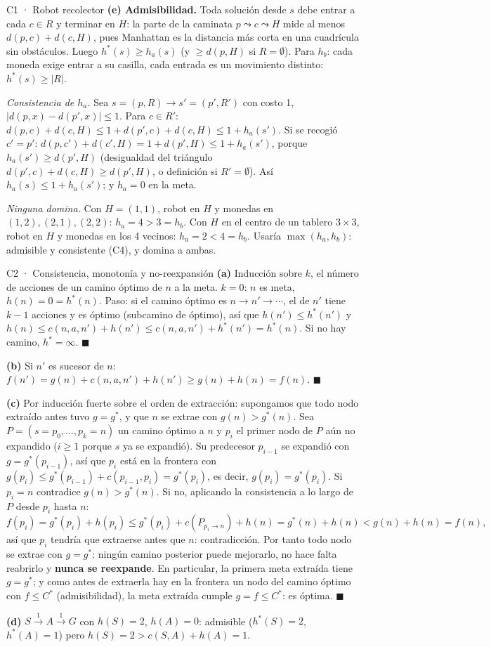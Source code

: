 \begin{solucion}{C1 · Robot recolector}
\textbf{(e) Admisibilidad.} Toda solución desde $s$ debe entrar a cada $c\in R$ y terminar en $H$: la
parte de la caminata $p\leadsto c\leadsto H$ mide al menos $d(p,c)+d(c,H)$, pues Manhattan es la
distancia más corta en una cuadrícula sin obstáculos. Luego $h^*(s)\ge h_a(s)$ (y $\ge d(p,H)$ si
$R=\emptyset$). Para $h_b$: cada moneda exige entrar a su casilla, cada entrada es un movimiento distinto:
$h^*(s)\ge|R|$.

\emph{Consistencia de $h_a$.} Sea $s=(p,R)\to s'=(p',R')$ con costo 1, $|d(p,x)-d(p',x)|\le1$.
Para $c\in R'$: $d(p,c)+d(c,H)\le1+d(p',c)+d(c,H)\le1+h_a(s')$. Si se recogió $c'=p'$:
$d(p,c')+d(c',H)=1+d(p',H)\le1+h_a(s')$, porque $h_a(s')\ge d(p',H)$ (desigualdad del triángulo
$d(p',c)+d(c,H)\ge d(p',H)$, o definición si $R'=\emptyset$). Así $h_a(s)\le1+h_a(s')$; y $h_a=0$ en la meta.

\emph{Ninguna domina.} Con $H=(1,1)$, robot en $H$ y monedas en $(1,2),(2,1),(2,2)$: $h_a=4>3=h_b$.
Con $H$ en el centro de un tablero $3\times3$, robot en $H$ y monedas en los 4 vecinos: $h_a=2<4=h_b$.
Usaría $\max(h_a,h_b)$: admisible y consistente (C4), y domina a ambas.
\end{solucion}

\begin{solucion}{C2 · Consistencia, monotonía y no-reexpansión}
\textbf{(a)} Inducción sobre $k$, el número de acciones de un camino óptimo de $n$ a la meta. $k=0$: $n$
es meta, $h(n)=0=h^*(n)$. Paso: si el camino óptimo es $n\to n'\to\cdots$, el de $n'$ tiene $k-1$
acciones y es óptimo (subcamino de óptimo), así que $h(n')\le h^*(n')$ y
$h(n)\le c(n,a,n')+h(n')\le c(n,a,n')+h^*(n')=h^*(n)$. Si no hay camino, $h^*=\infty$. $\blacksquare$

\textbf{(b)} Si $n'$ es sucesor de $n$: $f(n')=g(n)+c(n,a,n')+h(n')\ge g(n)+h(n)=f(n)$. $\blacksquare$

\textbf{(c)} Por inducción fuerte sobre el orden de extracción: supongamos que todo nodo extraído antes
tuvo $g=g^*$, y que $n$ se extrae con $g(n)>g^*(n)$. Sea $P=(s=p_0,\dots,p_k=n)$ un camino óptimo a $n$
y $p_i$ el primer nodo de $P$ aún no expandido ($i\ge1$ porque $s$ ya se expandió). Su predecesor
$p_{i-1}$ se expandió con $g=g^*(p_{i-1})$, así que $p_i$ está en la frontera con
$g(p_i)\le g^*(p_{i-1})+c(p_{i-1},p_i)=g^*(p_i)$, es decir, $g(p_i)=g^*(p_i)$. Si $p_i=n$ contradice
$g(n)>g^*(n)$. Si no, aplicando la consistencia a lo largo de $P$ desde $p_i$ hasta $n$:
\[f(p_i)=g^*(p_i)+h(p_i)\le g^*(p_i)+c(P_{p_i\to n})+h(n)=g^*(n)+h(n)<g(n)+h(n)=f(n),\]
así que $p_i$ tendría que extraerse antes que $n$: contradicción. Por tanto todo nodo se extrae
con $g=g^*$: ningún camino posterior puede mejorarlo, no hace falta reabrirlo y \textbf{nunca se
reexpande}. En particular, la primera meta extraída tiene $g=g^*$; y como antes de extraerla hay en la
frontera un nodo del camino óptimo con $f\le C^*$ (admisibilidad), la meta extraída cumple
$g=f\le C^*$: es óptima. $\blacksquare$

\textbf{(d)} $S\xrightarrow{1}A\xrightarrow{1}G$ con $h(S)=2$, $h(A)=0$: admisible ($h^*(S)=2$,
$h^*(A)=1$) pero $h(S)=2>c(S,A)+h(A)=1$.
\end{solucion}

